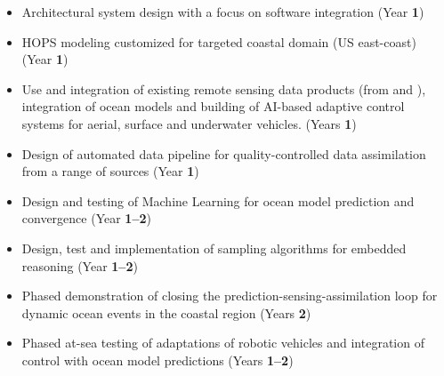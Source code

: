 
\ifkeck

\begin{itemize}[noitemsep,topsep=0pt,parsep=5pt,partopsep=10pt]

\item Architectural system design with a focus on software
  integration (Year \textbf{1})

\item HOPS modeling customized for targeted coastal domain (US
  east-coast) (Year \textbf{1})

\item Use and integration of existing remote sensing data products
  (from \esa and \nase), integration of ocean models and building of
  AI-based adaptive control systems for aerial, surface and underwater
  vehicles.  (Years \textbf{1})

\item Design of automated data pipeline for quality-controlled data
  assimilation from a range of sources (Year \textbf{1})

\item Design and testing of Machine Learning for ocean model
  prediction and convergence (Year \textbf{1--2})

\item Design, test and implementation of sampling algorithms for
  embedded reasoning (Year \textbf{1--2})

\item Phased demonstration of closing the
  prediction-sensing-assimilation loop for dynamic ocean events in the
  coastal region (Years \textbf{2})

\item Phased at-sea testing of adaptations of robotic vehicles and
  integration of control with ocean model predictions (Years
  \textbf{1--2})



\end{itemize}
